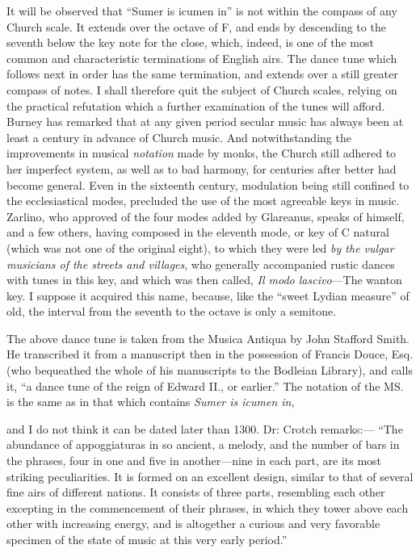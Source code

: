 It will be observed that “Sumer is icumen in” is not within the compass of
any Church scale. It extends over the octave of F, and ends by descending to the
seventh below the key note for the close, which, indeed, is one of the most common
and characteristic terminations of English airs. The dance tune which follows
next in order has the same termination, and extends over a still greater compass
of notes. I shall therefore quit the subject of Church scales, relying on the
practical refutation which a further examination of the tunes will afford. Burney
has remarked that at any given period secular music has always been at least a
century in advance of Church music. And notwithstanding the improvements
in musical \textit{notation} made by monks, the Church still adhered to her imperfect 
system, as well as to bad harmony, for \pagebreak
 centuries after better had become general.
Even in the sixteenth century, modulation being still confined to the ecclesiastical
modes, precluded the use of the most agreeable keys in music. Zarlino, who
approved of the four modes added by Glareanus, speaks of himself, and a few
others, having composed in the eleventh mode, or key of C natural (which was not
one of the original eight), to which they were led \textit{by the vulgar musicians of the
streets and villages}, who generally accompanied rustic dances with tunes in this
key, and which was then called, \textit{Il modo lascivo}—The wanton key. I suppose it
acquired this name, because, like the “sweet Lydian measure” of old, the interval
from the seventh to the octave is only a semitone.

\noindent\begin{minipage}{\textwidth}
\vspace{-2\baselineskip}
\vspace{\baselineskip}

\end{minipage}

The above dance tune is taken from the Musica Antiqua by John Stafford
Smith. He transcribed it from a manuscript then in the possession of Francis
Douce, Esq. (who bequeathed the whole of his manuscripts to the Bodleian
Library), and calls it, “a dance tune of the reign of Edward II., or earlier.”
The notation of the MS. is the same \pagebreak
as in that which contains \textit{Sumer is icumen in},
and I do not think it can be dated later than 1300. Dr: Crotch remarks:—
“The abundance of appoggiaturas in so ancient, a melody, and the number of bars
in the phrases, four in one and five in another—nine in each part, are its most
striking peculiarities. It is formed on an excellent design, similar to that of
several fine airs of different nations. It consists of three parts, resembling each
other excepting in the commencement of their phrases, in which they tower above
each other with increasing energy, and is altogether a curious and very favorable
specimen of the state of music at this very early period.”

